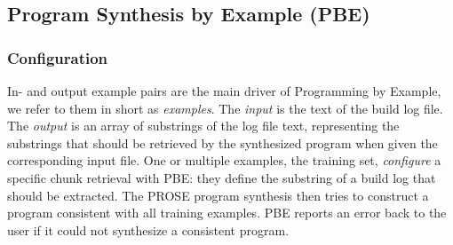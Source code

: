 \subsection{Program Synthesis by Example (PBE)}
\label{sec:expl-pbe}

\subsubsection{Configuration}
In- and output example pairs are the main driver of Programming by
Example, we refer to them in short as \emph{examples}. The
\emph{input} is the text of the build log file. The \emph{output} is
an array of substrings of the log file text, representing the
substrings that should be retrieved by the synthesized program when
given the corresponding input file. One or multiple examples, the
training set, \emph{configure} a specific chunk retrieval with PBE:
they define the substring of a build log that should be extracted. The
PROSE program synthesis then tries to construct a program consistent
with all training examples.
PBE reports an error back to the user if it could not synthesize a
consistent program.


